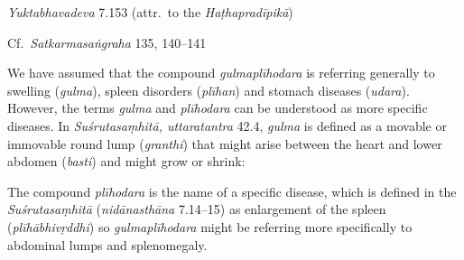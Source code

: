 \begin{ekdosis}
\begin{testimonia}[hp02_027]
\emph{Yuktabhavadeva} 7.153 (attr.~to the \emph{Haṭhapradīpikā})

\begin{versinnote}
\end{versinnote}

Cf.~\emph{Satkarmasaṅgraha} 135, 140–141

\begin{versinnote}
\end{versinnote}
\end{testimonia}

\begin{philcomm}[hp02_027]
We have assumed that the compound \emph{gulmaplīhodara} is referring generally to swelling (\emph{gulma}), spleen disorders (\emph{plīhan}) and stomach diseases (\emph{udara}). However, the terms \emph{gulma} and \emph{plīhodara} can be understood as more specific diseases. In \emph{Suśrutasaṃhitā, uttaratantra} 42.4, \emph{gulma} is defined as a movable or immovable round lump (\emph{granthi}) that might arise between the heart and lower abdomen (\emph{basti}) and might grow or shrink:

\begin{versinnote}
\end{versinnote}

The compound \emph{plīhodara} is the name of a specific disease, which is defined in the \emph{Suśrutasaṃhitā} (\emph{nidānasthāna} 7.14–15) as enlargement of the spleen (\emph{plīhābhivṛddhi}) so \emph{gulmaplīhodara} might be referring more specifically to abdominal lumps and splenomegaly.
\end{philcomm}


\end{ekdosis}
